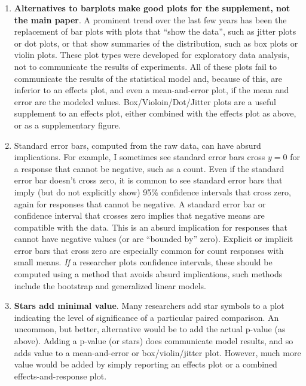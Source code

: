 \documentclass[]{book}
\providecommand{\tightlist}{%
  \setlength{\itemsep}{0pt}\setlength{\parskip}{0pt}}
\begin{document}
\begin{enumerate}
\def\labelenumi{\arabic{enumi}.}
\tightlist
\item
  \textbf{Alternatives to barplots make good plots for the supplement,
  not the main paper}. A prominent trend over the last few years has
  been the replacement of bar plots with plots that ``show the data'',
  such as jitter plots or dot plots, or that show summaries of the
  distribution, such as box plots or violin plots. These plot types were
  developed for exploratory data analysis, not to communicate the
  results of experiments. All of these plots fail to communicate the
  results of the statistical model and, because of this, are inferior to
  an effects plot, and even a mean-and-error plot, if the mean and error
  are the modeled values. Box/Violoin/Dot/Jitter plots are a useful
  supplement to an effects plot, either combined with the effects plot
  as above, or as a supplementary figure.
\item
  Standard error bars, computed from the raw data, can have absurd
  implications. For example, I sometimes see standard error bars cross
  \(y=0\) for a response that cannot be negative, such as a count. Even
  if the standard error bar doesn't cross zero, it is common to see
  standard error bars that imply (but do not explicitly show) 95\%
  confidence intervals that cross zero, again for responses that cannot
  be negative. A standard error bar or confidence interval that crosses
  zero implies that negative means are compatible with the data. This is
  an absurd implication for responses that cannot have negative values
  (or are ``bounded by'' zero). Explicit or implicit error bars that
  cross zero are especially common for count responses with small means.
  \emph{If} a researcher plots confidence intervals, these should be
  computed using a method that avoids absurd implications, such methods
  include the bootstrap and generalized linear models.
\item
  \textbf{Stars add minimal value}. Many researchers add star symbols to
  a plot indicating the level of significance of a particular paired
  comparison. An uncommon, but better, alternative would be to add the
  actual p-value (as above). Adding a p-value (or stars) does
  communicate model results, and so adds value to a mean-and-error or
  box/violin/jitter plot. However, much more value would be added by
  simply reporting an effects plot or a combined effects-and-response
  plot.
\end{enumerate}
\end{document}

